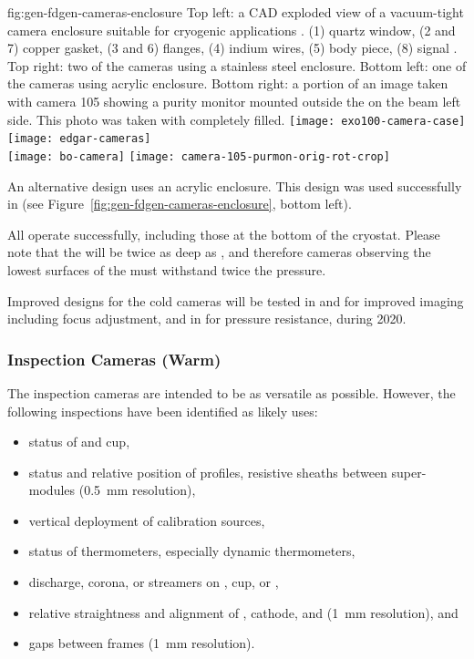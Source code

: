 \begin{dunefigure}{fig:gen-fdgen-cameras-enclosure}
  {Top left: a CAD exploded view of a vacuum-tight camera enclosure suitable for cryogenic applications \cite{Delaquis:2013hva}.
    (1) quartz window, (2 and 7) copper gasket, (3 and 6) flanges, (4) indium wires, (5) body piece, (8) signal \fdth.
    Top right: two of the  cameras using a stainless steel enclosure. 
    Bottom left: one of the  cameras using acrylic enclosure.
    Bottom right: a portion of an image taken with  camera 105 showing a purity monitor mounted outside the  on the beam left side. This photo was taken with  completely filled.
  }
  \texttt{[image: exo100-camera-case]}%
  \texttt{[image: edgar-cameras]}\\
  \hfill \texttt{[image: bo-camera]}%
  \hfill \texttt{[image: camera-105-purmon-orig-rot-crop]}%
  \hfill
\end{dunefigure}

An alternative design uses an acrylic enclosure.
This design was used successfully in  (see Figure~\ref{fig:gen-fdgen-cameras-enclosure}, bottom left).

All operate successfully, including those at the bottom of the cryostat.  Please note that the   will be twice as deep as , and therefore cameras observing the lowest surfaces of the  must withstand twice the pressure.

Improved designs for the cold cameras will be tested in  and  for improved imaging including focus adjustment, and in  for pressure resistance, during 2020. 

\subsubsection{Inspection Cameras (Warm)}

The inspection cameras are intended to be as versatile as possible.
However, the following %
inspections have been identified as likely uses:
\begin{itemize}
\item status of  \fdth and cup,
\item status and relative position of  profiles, resistive sheaths between  super-modules (\SI{0.5}{mm} resolution),
\item vertical deployment of calibration sources,
\item status of thermometers, especially dynamic thermometers,
\item {} discharge, corona, or streamers on  \fdth, cup, or ,
\item relative straightness and alignment of , cathode, and  (\SI{1}{mm} resolution), and
\item gaps between  frames (\SI{1}{mm} resolution).
\end{itemize}

